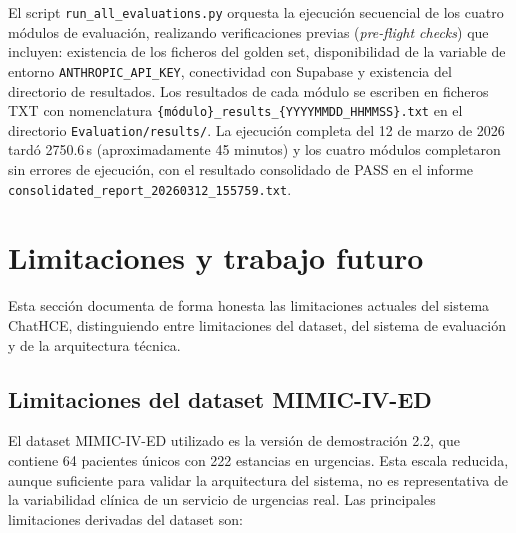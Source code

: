 El script \texttt{run\_all\_evaluations.py} orquesta la ejecución secuencial
de los cuatro módulos de evaluación, realizando verificaciones previas
(\textit{pre-flight checks}) que incluyen: existencia de los ficheros del
golden set, disponibilidad de la variable de entorno \texttt{ANTHROPIC\_API\_KEY},
conectividad con Supabase y existencia del directorio de resultados.
Los resultados de cada módulo se escriben en ficheros TXT con nomenclatura
\texttt{\{módulo\}\_results\_\{YYYYMMDD\_HHMMSS\}.txt} en el directorio
\texttt{Evaluation/results/}. La ejecución completa del 12 de marzo de 2026
tardó 2750.6\,s (aproximadamente 45 minutos) y los cuatro módulos completaron
sin errores de ejecución, con el resultado consolidado de PASS en el informe
\texttt{consolidated\_report\_20260312\_155759.txt}.


\section{Limitaciones y trabajo futuro}
\label{sec:limitaciones}

\begin{tcolorbox}[
  colback=orange!5,
  colframe=orange!70!black,
  title={\textbf{Limitaciones identificadas del sistema}},
  fonttitle=\small\bfseries,
  left=6pt, right=6pt, top=4pt, bottom=4pt
]
\small
Esta sección documenta de forma honesta las limitaciones actuales del sistema
ChatHCE, distinguiendo entre limitaciones del dataset, del sistema de evaluación
y de la arquitectura técnica.
\end{tcolorbox}

\subsection{Limitaciones del dataset MIMIC-IV-ED}
\label{sec:lim_dataset}

El dataset MIMIC-IV-ED utilizado es la versión de demostración 2.2, que
contiene 64 pacientes únicos con 222 estancias en urgencias. Esta escala
reducida, aunque suficiente para validar la arquitectura del sistema, no
es representativa de la variabilidad clínica de un servicio de urgencias
real. Las principales limitaciones derivadas del dataset son:

